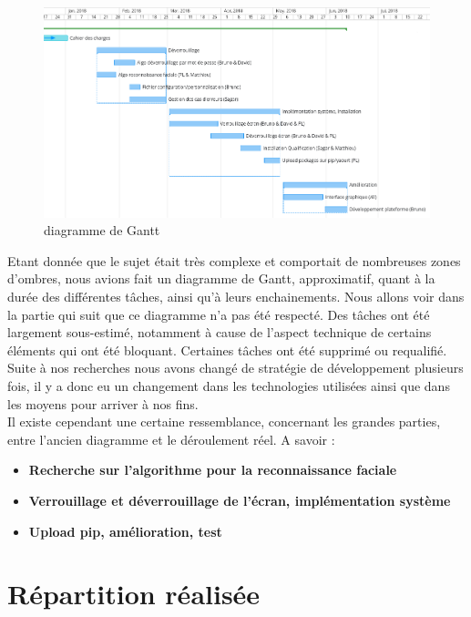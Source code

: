 \documentclass[french]{report}
\begin{document}
\begin{figure}[h]\label{fig:gantt.png}
  \includegraphics[width=\linewidth]{Gantt}
  \caption{diagramme de Gantt}
  \label{fig:gantt.png}
\end{figure}

Etant donnée que le sujet était très complexe et comportait de nombreuses zones
d'ombres, nous avions fait un diagramme de Gantt, approximatif, quant à la durée
des différentes tâches, ainsi qu'à leurs enchainements. Nous allons voir dans
la partie qui suit que ce diagramme n'a pas été respecté. Des tâches ont été
largement sous-estimé, notamment à cause de l'aspect technique de certains
éléments qui ont été bloquant. Certaines tâches ont été supprimé ou requalifié.
Suite à nos recherches nous avons changé de stratégie de développement plusieurs
fois, il y a donc eu un changement dans les technologies utilisées ainsi que dans les
moyens pour arriver à nos fins.
\\
Il existe cependant une certaine ressemblance, concernant les grandes parties,
entre l'ancien diagramme et le déroulement réel. A savoir :

\vspace{0.5cm}
\begin{itemize}
  \item{\textbf{Recherche sur l'algorithme pour la reconnaissance faciale}}
  \item{\textbf{Verrouillage et déverrouillage de l'écran, implémentation système}}
  \item{\textbf{Upload pip, amélioration, test}}
\end{itemize}
\vspace{0.5cm}

\section{Répartition réalisée}
\end{document}
